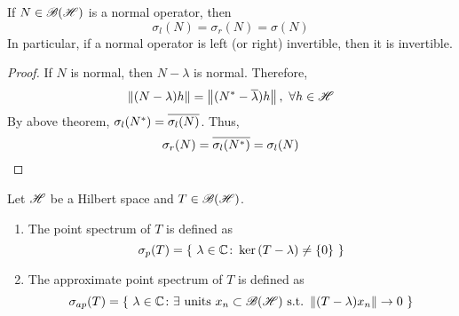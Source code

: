 \documentclass[a4paper,11pt]{report}
\begin{document}
\begin{cor} \label{cor11}
	If $N \in \mathscr{B(H)}$ is a normal operator, then
	\begin{equation*}
		\sigma_l(N) = \sigma_r(N) = \sigma(N)
	\end{equation*}
	In particular, if a normal operator is left (or right) invertible, then it is invertible.
\end{cor}
\begin{proof}
	If $N$ is normal, then $N-\lambda$ is normal. Therefore,
	\begin{equation*}
		\left\lVert(N-\lambda)h\right\lVert = \left\lVert(N^{*}-\overline{\lambda})h\right\lVert,~ \forall h \in \mathscr{H}
	\end{equation*}
	By above theorem, $\sigma_l(N^{*}) = \overline{\sigma_l(N)}$. Thus,
	\begin{equation*}
		\sigma_r(N) = \overline{\sigma_l(N^{*})} = \sigma_l(N) \qedhere
	\end{equation*}
\end{proof}

\begin{defn}
	Let $\mathscr{H}$ be a Hilbert space and $T \in \mathscr{B(H)}$.
	\begin{enumerate}[label=\arabic*)]
		\item The point spectrum of $T$ is defined as
		\begin{equation*}
			\sigma_p(T) = \{~ \lambda \in \mathbb{C} \colon \ker{(T-\lambda)} \neq \{0\}~\}
		\end{equation*}
		\item The approximate point spectrum of $T$ is defined as 
		\begin{equation*}
			\sigma_{ap}(T) =\{~\lambda \in \mathbb{C} \colon \exists~\text{units }{x_n} \subset \mathscr{B(H)} ~\text{s.t.}~ \left\lVert(T-\lambda)x_n\right\lVert \rightarrow 0~\}
		\end{equation*}
	\end{enumerate}
\end{defn}
\end{document}
